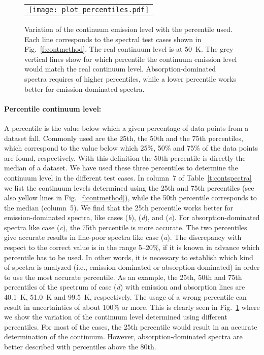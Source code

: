\documentclass{aa}
\begin{document}
\begin{figure}[t]
\begin{center}
\begin{tabular}[b]{c}
        \texttt{[image: plot\_percentiles.pdf]} \\
\end{tabular}
\caption{Variation of the continuum emission level with the percentile used. Each line corresponds to the spectral test cases shown in Fig.~\ref{f:contmethod}. The real continuum level is at 50~K. The grey vertical lines show for which percentile the continuum emission level would match the real continuum level. Absorption-dominated spectra requires of higher percentiles, while a lower percentile works better for emission-dominated spectra.}
\label{f:percentiles}
\end{center}
\end{figure}

\paragraph{\textbf{Percentile continuum level}:}
A percentile is the value below which a given percentage of data points from a dataset fall. Commonly used are the 25th, the 50th and the 75th percentiles, which correspond to the value below which 25\%, 50\% and 75\% of the data points are found, respectively. With this definition the 50th percentile is directly the median of a dataset. We have used these three percentiles to determine the continuum level in the different test cases. In column~7 of Table~\ref{t:contspectra} we list the continuum levels determined using the 25th and 75th percentiles (see also yellow lines in Fig.~\ref{f:contmethod}), while the 50th percentile corresponds to the median (column~5). We find that the 25th percentile works better for emission-dominated spectra, like cases (\textit{b}), (\textit{d}), and (\textit{e}). For absorption-dominated spectra like case (\textit{c}), the 75th percentile is more accurate. The two percentiles give accurate results in line-poor spectra like case (\textit{a}). The discrepancy with respect to the correct value is in the range 5--20\%, if it is known in advance which percentile has to be used. In other words, it is necessary to establish which kind of spectra is analyzed (i.e., emission-dominated or absorption-dominated) in order to use the most accurate percentile. As an example, the 25th, 50th and 75th percentiles of the spectrum of case (\textit{d}) with emission and absorption lines are 40.1~K, 51.0~K and 99.5~K, respectively. The usage of a wrong percentile can result in uncertainties of about 100\% or more. This is clearly seen in Fig.~\ref{f:percentiles} where we show the variation of the continuum level determined using different percentiles. For most of the cases, the 25th percentile would result in an accurate determination of the continuum. However, absorption-dominated spectra are better described with percentiles above the 80th.
\end{document}
